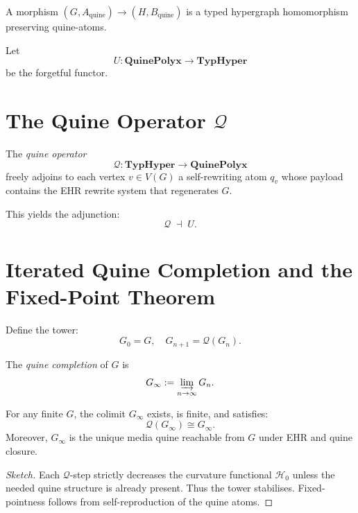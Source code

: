 A morphism $(G,A_{\mathrm{quine}})\to(H,B_{\mathrm{quine}})$ is a typed
hypergraph homomorphism preserving quine-atoms.

Let
\[
U:\mathbf{QuinePolyx}\to\mathbf{TypHyper}
\]
be the forgetful functor.

\section{The Quine Operator \texorpdfstring{$\mathcal{Q}$}{Q}}

\begin{definition}
The \emph{quine operator}
\[
\mathcal{Q} : \mathbf{TypHyper} \longrightarrow \mathbf{QuinePolyx}
\]
freely adjoins to each vertex $v\in V(G)$ a self-rewriting atom $q_v$ whose 
payload contains the EHR rewrite system that regenerates $G$.
\end{definition}

This yields the adjunction:
\[
\mathcal{Q} \;\dashv\; U.
\]

\section{Iterated Quine Completion and the Fixed-Point Theorem}

Define the tower:
\[
G_0=G,\quad G_{n+1}=\mathcal{Q}(G_n).
\]

\begin{definition}
The \emph{quine completion} of $G$ is
\[
G_\infty := \varinjlim_{n\to\infty} G_n.
\]
\end{definition}

\begin{theorem}
\label{thm:quine-fixed-point}
For any finite $G$, the colimit $G_\infty$ exists, is finite, and satisfies:
\[
\mathcal{Q}(G_\infty)\cong G_\infty.
\]
Moreover, $G_\infty$ is the unique media quine reachable from $G$ under EHR and
quine closure.
\end{theorem}

\begin{proof}[Sketch]
Each $\mathcal{Q}$-step strictly decreases the curvature functional $\mathcal{H}_0$
unless the needed quine structure is already present.  
Thus the tower stabilises.  
Fixed-pointness follows from self-reproduction of the quine atoms.
\end{proof}

